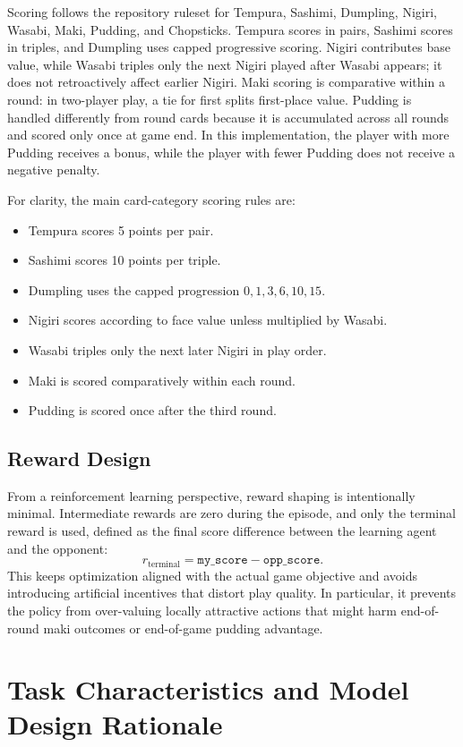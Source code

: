 \documentclass[10pt]{article}
\begin{document}
Scoring follows the repository ruleset for Tempura, Sashimi, Dumpling, Nigiri, Wasabi, Maki, Pudding, and Chopsticks. Tempura scores in pairs, Sashimi scores in triples, and Dumpling uses capped progressive scoring. Nigiri contributes base value, while Wasabi triples only the next Nigiri played after Wasabi appears; it does not retroactively affect earlier Nigiri. Maki scoring is comparative within a round: in two-player play, a tie for first splits first-place value. Pudding is handled differently from round cards because it is accumulated across all rounds and scored only once at game end. In this implementation, the player with more Pudding receives a bonus, while the player with fewer Pudding does not receive a negative penalty.

For clarity, the main card-category scoring rules are:
\begin{itemize}
  \item Tempura scores 5 points per pair.
  \item Sashimi scores 10 points per triple.
  \item Dumpling uses the capped progression \(0,1,3,6,10,15\).
  \item Nigiri scores according to face value unless multiplied by Wasabi.
  \item Wasabi triples only the next later Nigiri in play order.
  \item Maki is scored comparatively within each round.
  \item Pudding is scored once after the third round.
\end{itemize}

\subsection{Reward Design}

From a reinforcement learning perspective, reward shaping is intentionally minimal. Intermediate rewards are zero during the episode, and only the terminal reward is used, defined as the final score difference between the learning agent and the opponent:
\[
r_{\text{terminal}} = \texttt{my\_score} - \texttt{opp\_score}.
\]
This keeps optimization aligned with the actual game objective and avoids introducing artificial incentives that distort play quality. In particular, it prevents the policy from over-valuing locally attractive actions that might harm end-of-round maki outcomes or end-of-game pudding advantage.

\section{Task Characteristics and Model Design Rationale}
\end{document}
